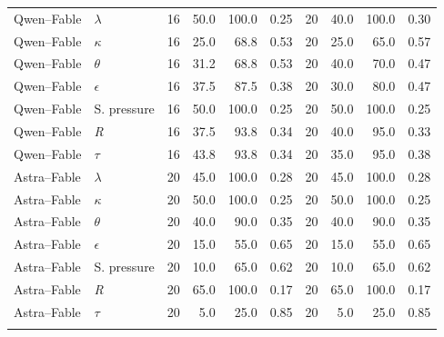\documentclass[11pt]{article}
\begin{document}
\begin{longtable}{@{}llrrrr@{\quad}rrrr@{}}
Qwen--Fable & $\lambda$ & 16 & 50.0 & 100.0 & 0.25 & 20 & 40.0 & 100.0 & 0.30 \\
Qwen--Fable & $\kappa$ & 16 & 25.0 & 68.8 & 0.53 & 20 & 25.0 & 65.0 & 0.57 \\
Qwen--Fable & $\theta$ & 16 & 31.2 & 68.8 & 0.53 & 20 & 40.0 & 70.0 & 0.47 \\
Qwen--Fable & $\epsilon$ & 16 & 37.5 & 87.5 & 0.38 & 20 & 30.0 & 80.0 & 0.47 \\
Qwen--Fable & S. pressure & 16 & 50.0 & 100.0 & 0.25 & 20 & 50.0 & 100.0 & 0.25 \\
Qwen--Fable & \textit{R} & 16 & 37.5 & 93.8 & 0.34 & 20 & 40.0 & 95.0 & 0.33 \\
Qwen--Fable & $\tau$ & 16 & 43.8 & 93.8 & 0.34 & 20 & 35.0 & 95.0 & 0.38 \\ \addlinespace[3pt]
Astra--Fable & $\lambda$ & 20 & 45.0 & 100.0 & 0.28 & 20 & 45.0 & 100.0 & 0.28 \\
Astra--Fable & $\kappa$ & 20 & 50.0 & 100.0 & 0.25 & 20 & 50.0 & 100.0 & 0.25 \\
Astra--Fable & $\theta$ & 20 & 40.0 & 90.0 & 0.35 & 20 & 40.0 & 90.0 & 0.35 \\
Astra--Fable & $\epsilon$ & 20 & 15.0 & 55.0 & 0.65 & 20 & 15.0 & 55.0 & 0.65 \\
Astra--Fable & S. pressure & 20 & 10.0 & 65.0 & 0.62 & 20 & 10.0 & 65.0 & 0.62 \\
Astra--Fable & \textit{R} & 20 & 65.0 & 100.0 & 0.17 & 20 & 65.0 & 100.0 & 0.17 \\
Astra--Fable & $\tau$ & 20 & 5.0 & 25.0 & 0.85 & 20 & 5.0 & 25.0 & 0.85 \\ \addlinespace[3pt]
\end{longtable}
\endgroup
\end{document}
